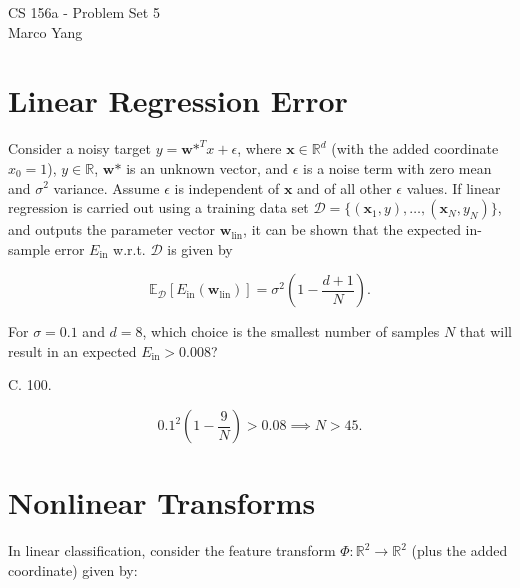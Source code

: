 \documentclass[answers]{exam}
\begin{document}
\begin{center}
{\Large CS 156a - Problem Set 5} \\
\medskip
Marco Yang \\
\bigskip
\end{center}

\section*{Linear Regression Error}

Consider a noisy target \( y = \textbf{w*}^T x + \epsilon \), where 
\( \textbf{x} \in \mathbb{R}^d \) (with the added coordinate \( x_0 = 1 \)), 
\( y \in \mathbb{R} \), \( \textbf{w*} \) is an unknown vector, and \( \epsilon \) 
is a noise term with zero mean and \( \sigma^2 \) variance. Assume \( \epsilon \) 
is independent of \( \textbf{x} \) and of all other \( \epsilon \) values. If 
linear regression is carried out using a training data set $\mathcal{D}=
\{(\textbf{x}_{1}, y), \ldots, (\textbf{x}_{N}, y_{N})\}$, and outputs the 
parameter vector $\textbf{w}_{\text{lin}}$, it can be shown that the expected
in-sample error $E_{\text{in}}$ w.r.t. $\mathcal{D}$ is given by

\[
\mathbb{E}_\mathcal{D}[E_{\text{in}}(\textbf{w}_{\text{lin}})] = \sigma^2 \left(1 - \frac{d+1}{N}\right)
.\]

\begin{questions}

\question 
For \( \sigma = 0.1 \) and \( d = 8 \), which choice is the smallest number of
samples \( N \) that will result in an expected \( E_{\text{in}} > 0.008 \)?

\begin{choices}
\end{choices}

\begin{solution}
C. 100.

\[
0.1^2\left( 1 - \frac{9}{N} \right) > 0.08 \implies N > 45
.\] 
\end{solution}

\end{questions}

\section*{Nonlinear Transforms}

In linear classification, consider the feature transform 
\( \Phi: \mathbb{R}^2 \rightarrow \mathbb{R}^2 \) (plus the added coordinate) 
given by:
\end{document}
